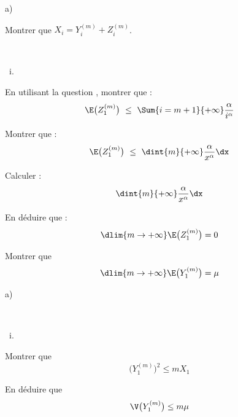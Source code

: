 \begin{liste}{a)}
  \setlength{\itemsep}{2mm}
\item Montrer que $X_{i} = Y_{i}^{(m)} + Z_{i}^{(m)}$.
  
  

\item ~\\[-1.15cm]
\end{liste}
\begin{liste}{\ i.}
\item En utilisant la question , montrer que :
  \[
  \E\big(Z_{1}^{(m)} \big) \ \leq \ \Sum{i = m + 1}{+ \infty}
  \dfrac{\alpha}{i^{\alpha}}
  \]
  
  




\item Montrer que :
  \[
  \E\big(Z_{1}^{(m)} \big) \ \leq \ \dint{m}{+ \infty}
  \dfrac{\alpha}{x^{\alpha}} \dx
  \]

  
  
\item Calculer :
  \[
  \dint{m}{+ \infty} \dfrac{\alpha}{x^{\alpha}} \dx
  \]

  

\item En déduire que :
  \[
  \dlim{m \to + \infty} \E\big(Z_{1}^{(m)} \big) = 0
  \]

  
  
\item Montrer que
  \[
  \dlim{m \to + \infty} \E\big(Y_{1}^{(m)} \big) = \mu
  \]

  
\end{liste}




\begin{liste}{a)}
  \setcounter{enumi}{2}
\item ~\\[-1.15cm]
\end{liste}
\begin{liste}{\ i.}
\item Montrer que
  \[
  \big( Y_{1}^{(m)} \big)^{2} \leq m X_{1}
  \]
  
  
  
\item En déduire que
  \[
  \V\big(Y_{1}^{(m)} \big) \leq m \mu
  \]
  
  
\end{liste}

